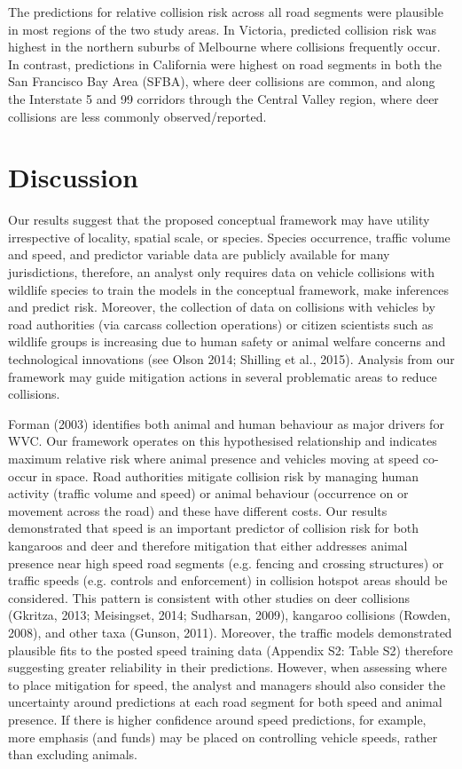 The predictions for relative collision risk across all road segments were plausible in most regions of the two study areas.  In Victoria, predicted collision risk was highest in the northern suburbs of Melbourne where collisions frequently occur. In contrast, predictions in California were highest on road segments in both the San Francisco Bay Area (SFBA), where deer collisions are common, and along the Interstate 5 and 99 corridors through the Central Valley region, where deer collisions are less commonly observed/reported.

\section{Discussion}

Our results suggest that the proposed conceptual framework may have utility irrespective of locality, spatial scale, or species.  Species occurrence, traffic volume and speed, and  predictor variable data are publicly available for many jurisdictions, therefore, an analyst only requires data on vehicle collisions with wildlife species to train the models in the conceptual framework, make inferences and predict risk.  Moreover, the collection of data on collisions with vehicles by road authorities (via carcass collection operations) or citizen scientists such as wildlife groups is increasing due to human safety or animal welfare concerns and technological innovations (see Olson 2014; Shilling et al., 2015).  Analysis from our framework may guide mitigation actions in several problematic areas to reduce collisions.

Forman (2003) identifies both animal and human behaviour as major drivers for WVC.  Our framework operates on this hypothesised relationship and indicates maximum relative risk where animal presence and vehicles moving at speed co-occur in space.  Road authorities mitigate collision risk by managing human activity (traffic volume and speed) or animal behaviour (occurrence on or movement across the road) and these have different costs.  Our results demonstrated that speed is an important predictor of collision risk for both kangaroos and deer and therefore mitigation that either addresses animal presence near high speed road segments (e.g. fencing and crossing structures) or traffic speeds (e.g. controls and enforcement) in collision hotspot areas should be considered.  This pattern is consistent with other studies on deer collisions (Gkritza, 2013; Meisingset, 2014; Sudharsan, 2009), kangaroo collisions (Rowden, 2008), and other taxa (Gunson, 2011).  Moreover, the traffic models demonstrated plausible fits to the posted speed training data (Appendix S2: Table S2) therefore suggesting greater reliability in their predictions.  However, when assessing where to place mitigation for speed, the analyst and managers should also consider the uncertainty around predictions at each road segment for both speed and animal presence. If there is higher confidence around speed predictions, for example, more emphasis (and funds) may be placed on controlling vehicle speeds, rather than excluding animals.

